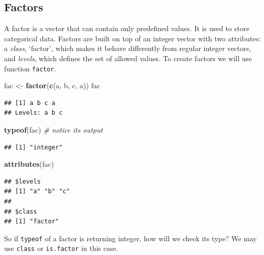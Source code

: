 \documentclass[
]{book}
\newenvironment{Shaded}{\begin{snugshade}}{\end{snugshade}}
\newcommand{\CommentTok}[1]{\textcolor[rgb]{0.56,0.35,0.01}{\textit{#1}}}
\newcommand{\FunctionTok}[1]{\textcolor[rgb]{0.13,0.29,0.53}{\textbf{#1}}}
\newcommand{\NormalTok}[1]{#1}
\newcommand{\OtherTok}[1]{\textcolor[rgb]{0.56,0.35,0.01}{#1}}
\newcommand{\StringTok}[1]{\textcolor[rgb]{0.31,0.60,0.02}{#1}}
\begin{document}
\hypertarget{factors}{%
\subsection{Factors}\label{factors}}

A factor is a vector that can contain only predefined values. It is used to store categorical data. Factors are built on top of an integer vector with two attributes: a \emph{class}, `factor', which makes it behave differently from regular integer vectors, and \emph{levels}, which defines the set of allowed values. To create factors we will use function \texttt{factor}.

\begin{Shaded}
\begin{Highlighting}[]
\NormalTok{fac }\OtherTok{\textless{}{-}} \FunctionTok{factor}\NormalTok{(}\FunctionTok{c}\NormalTok{(}\StringTok{\textquotesingle{}a\textquotesingle{}}\NormalTok{, }\StringTok{\textquotesingle{}b\textquotesingle{}}\NormalTok{, }\StringTok{\textquotesingle{}c\textquotesingle{}}\NormalTok{, }\StringTok{\textquotesingle{}a\textquotesingle{}}\NormalTok{))}
\NormalTok{fac}
\end{Highlighting}
\end{Shaded}

\begin{verbatim}
## [1] a b c a
## Levels: a b c
\end{verbatim}

\begin{Shaded}
\begin{Highlighting}[]
\FunctionTok{typeof}\NormalTok{(fac) }\CommentTok{\# notice its output}
\end{Highlighting}
\end{Shaded}

\begin{verbatim}
## [1] "integer"
\end{verbatim}

\begin{Shaded}
\begin{Highlighting}[]
\FunctionTok{attributes}\NormalTok{(fac)}
\end{Highlighting}
\end{Shaded}

\begin{verbatim}
## $levels
## [1] "a" "b" "c"
## 
## $class
## [1] "factor"
\end{verbatim}

So if \texttt{typeof} of a factor is returning integer, how will we check its type? We may use \texttt{class} or \texttt{is.factor} in this case.
\end{document}
